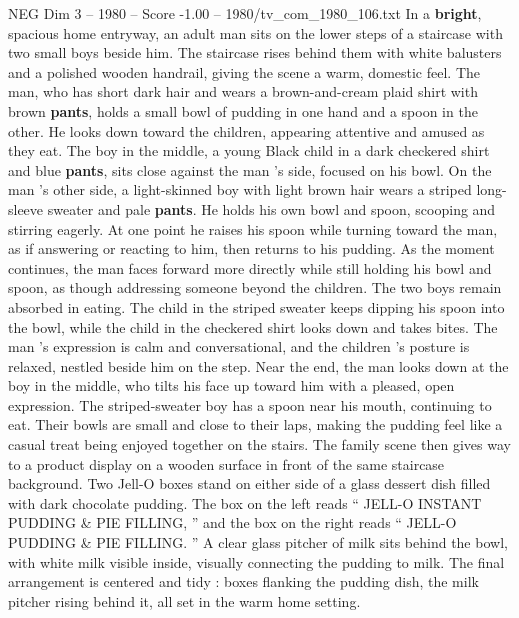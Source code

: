 \begin{textsample}{NEG Dim 3 – 1980 – Score -1.00 – 1980/tv\_com\_1980\_106.txt}  \label{ex:f3_neg_059}
In a \textbf{bright}, spacious home entryway, an adult man sits on the lower steps of a staircase with two small boys beside him.
The staircase rises behind them with white balusters and a polished wooden handrail, giving the scene a warm, domestic feel.
The man, who has short dark hair and wears a brown-and-cream plaid shirt with brown \textbf{pants}, holds a small bowl of pudding in one hand and a spoon in the other.
He looks down toward the children, appearing attentive and amused as they eat.
The boy in the middle, a young Black child in a dark checkered shirt and blue \textbf{pants}, sits close against the man ’s side, focused on his bowl.
On the man ’s other side, a light-skinned boy with light brown hair wears a striped long-sleeve sweater and pale \textbf{pants}.
He holds his own bowl and spoon, scooping and stirring eagerly.
At one point he raises his spoon while turning toward the man, as if answering or reacting to him, then returns to his pudding.
As the moment continues, the man faces forward more directly while still holding his bowl and spoon, as though addressing someone beyond the children.
The two boys remain absorbed in eating.
The child in the striped sweater keeps dipping his spoon into the bowl, while the child in the checkered shirt looks down and takes bites.
The man ’s expression is calm and conversational, and the children ’s posture is relaxed, nestled beside him on the step.
Near the end, the man looks down at the boy in the middle, who tilts his face up toward him with a pleased, open expression.
The striped-sweater boy has a spoon near his mouth, continuing to eat.
Their bowls are small and close to their laps, making the pudding feel like a casual treat being enjoyed together on the stairs.
The family scene then gives way to a product display on a wooden surface in front of the same staircase background.
Two Jell-O boxes stand on either side of a glass dessert dish filled with dark chocolate pudding.
The box on the left reads “ JELL-O INSTANT PUDDING \& PIE FILLING, ” and the box on the right reads “ JELL-O PUDDING \& PIE FILLING. ” A clear glass pitcher of milk sits behind the bowl, with white milk visible inside, visually connecting the pudding to milk.
The final arrangement is centered and tidy : boxes flanking the pudding dish, the milk pitcher rising behind it, all set in the warm home setting.

\end{textsample}
